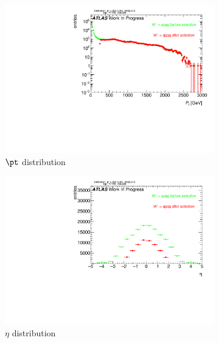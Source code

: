 \begin{figure}
    \centering
    \begin{subfigure}[b]{0.45\textwidth}
        \includegraphics[width=\textwidth]{jet_part/appendixA/tops/1cfrt_h_FatJet_pt.pdf}
        \caption{$\pt$ distribution}
        \label{fig:gull}
    \end{subfigure}
    \begin{subfigure}[b]{0.45\textwidth}
        \includegraphics[width=\textwidth]{jet_part/appendixA/tops/1cfrt_h_FatJet_eta.pdf}
        \caption{$\eta$ distribution}
        \label{fig:tiger}
    \end{subfigure}
    \begin{subfigure}[b]{0.45\textwidth}

\end{subfigure}
\end{figure}
